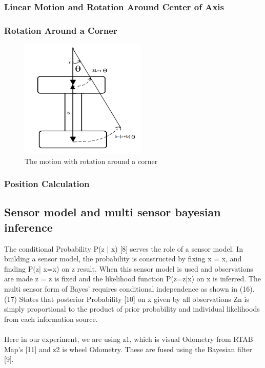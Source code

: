 \documentclass[conference]{IEEEtran}
\begin{document}
\subsubsection{Linear Motion and Rotation Around Center of Axis}
\subsubsection{Rotation Around a Corner}
\begin{figure}[h]
\includegraphics[width=6cm]{motionwithrotation.png}
\centering
\caption{The motion with rotation around a corner}\label{net_img}
\end{figure}
\subsubsection{Position Calculation}

\subsection{Sensor model and multi sensor bayesian inference}
The conditional Probability P(z | x) [8] serves the role of a sensor model. In building a sensor model, the probability is constructed by fixing x = x, and finding P(z| x=x) on z result. When this sensor model is used and observations are made z = z is fixed and the likelihood function P(z=z|x) on x is inferred. The multi sensor form of Bayes’ requires conditional independence as shown in (16). (17) States that posterior Probability [10] on x given by all observations Zn is simply proportional to the product of prior probability and individual likelihoods from each information source.
\\
\\
Here in our experiment, we are using z1, which is visual Odometry from RTAB Map's [11] and z2 is wheel Odometry. These are fused using the Bayesian filter [9].
\end{document}
